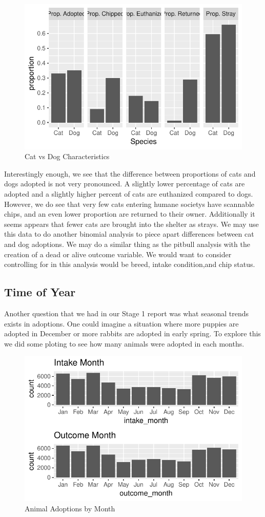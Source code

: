 \documentclass[]{article}
\begin{document}
\begin{figure}[H]

{\centering \includegraphics[width=0.6\linewidth]{Stage_2_files/figure-latex/DogCat Figure-1} 

}

\caption{Cat vs Dog Characteristics}\label{fig:DogCat Figure}
\end{figure}

Interestingly enough, we see that the difference between proportions of
cats and dogs adopted is not very pronounced. A slightly lower
percentage of cats are adopted and a slightly higher percent of cats are
euthanized compared to dogs. However, we do see that very few cats
entering humane societys have scannable chips, and an even lower
proportion are returned to their owner. Additionally it seems appears
that fewer cats are brought into the shelter as strays. We may use this
data to do another binomial analysis to piece apart differences between
cat and dog adoptions. We may do a similar thing as the pitbull analysis
with the creation of a dead or alive outcome variable. We would want to
consider controlling for in this analysis would be breed, intake
condition,and chip status.

\subsection{Time of Year}\label{time-of-year}

Another question that we had in our Stage 1 report was what seasonal
trends exists in adoptions. One could imagine a situation where more
puppies are adopted in December or more rabbits are adopted in early
spring. To explore this we did some ploting to see how many animals were
adopted in each months.

\begin{figure}[H]

{\centering \includegraphics[width=0.6\linewidth]{Stage_2_files/figure-latex/Month Figure-1} 

}

\caption{Animal Adoptions by Month}\label{fig:Month Figure}
\end{figure}
\end{document}
